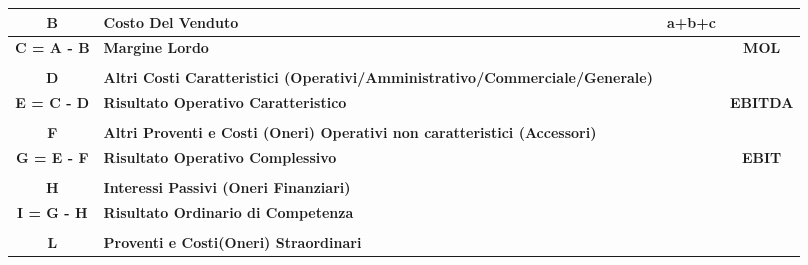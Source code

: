 \documentclass{article}
\begin{document}
\begin{table}[ht]
{\begin{tabular}{|c|l|c|c|}
            \textbf{B}         & \textbf{Costo Del Venduto }                                                         & a+b+c               &                 \\
            \hline
            \textbf{C = A - B} & \textbf{Margine Lordo}                                                              &                     & \textbf{MOL}    \\
            \hline
                               &                                                                                     &                     &                 \\
            \textbf{D}         & \textbf{Altri Costi Caratteristici (Operativi/Amministrativo/Commerciale/Generale)} &                     &                 \\
            \hline
            \textbf{E = C - D} & \textbf{Risultato Operativo Caratteristico}                                         &                     & \textbf{EBITDA} \\
            \hline
                               &                                                                                     &                     &                 \\
            \textbf{F}         & \textbf{Altri Proventi e Costi (Oneri) Operativi non caratteristici (Accessori)}    &                     &                 \\
            \hline
            \textbf{G = E - F} & \textbf{Risultato Operativo Complessivo}                                            &                     & \textbf{EBIT}   \\
            \hline
                               &                                                                                     &                     &                 \\
            \textbf{H}         & \textbf{Interessi Passivi (Oneri Finanziari)}                                       &                     &                 \\
            \hline
            \textbf{I = G - H} & \textbf{Risultato Ordinario di Competenza}                                          &                     &                 \\
            \hline
                               &                                                                                     &                     &                 \\
            \textbf{L}         & \textbf{Proventi e Costi(Oneri) Straordinari}                                       &                     &                 \\

\end{tabular}}
\end{table}
\end{document}
